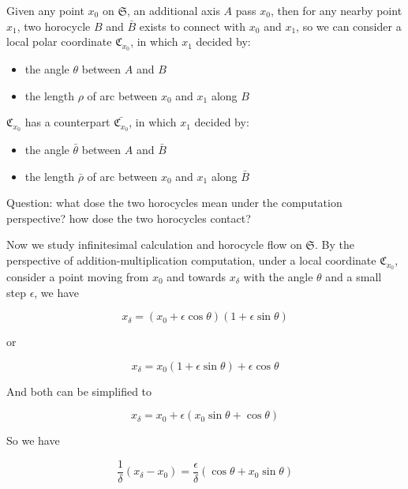 \documentclass{article}
\begin{document}
Given any point $x_0$ on $\mathfrak{S}$, an additional axis $A$ pass $x_0$, then for any nearby point $x_1$, two
horocycle $B$ and $\bar{B}$ exists to connect with $x_0$ and $x_1$, so we can consider a local polar coordinate
$\mathfrak{C}_{x_0}$, in which $x_1$ decided by:
\begin{itemize}
    \item the angle $\theta$ between $A$ and $B$
    \item the length $\rho$ of arc between $x_0$ and $x_1$ along $B$
\end{itemize}

$\mathfrak{C}_{x_0}$ has a counterpart $\bar{\mathfrak{C}_{x_0}}$, in which $x_1$ decided by:
\begin{itemize}
    \item the angle $\bar{\theta}$ between $A$ and $\bar{B}$
    \item the length $\bar{\rho}$ of arc between $x_0$ and $x_1$ along $\bar{B}$
\end{itemize}

Question: what dose the two horocycles mean under the computation perspective? how dose the two horocycles contact?

Now we study infinitesimal calculation and horocycle flow on $\mathfrak{S}$. By the perspective of
addition-multiplication computation, under a local coordinate $\mathfrak{C}_{x_0}$,
consider a point moving from $x_0$ and towards $x_{\delta}$ with the angle $\theta$ and a small step $\epsilon$, we have

\begin{equation}
    x_{\delta} = (x_0 + \epsilon \cos \theta)(1 + \epsilon \sin \theta)
\end{equation}

or

\begin{equation}
    x_{\delta} = x_0 (1 + \epsilon \sin \theta) + \epsilon \cos \theta
\end{equation}

And both can be simplified to

\begin{equation}
    x_{\delta} = x_0 + \epsilon (x_0 \sin \theta + \cos \theta)
\end{equation}

So we have

\begin{equation}
    \frac{1}{\delta} (x_{\delta} - x_0) = \frac{\epsilon}{\delta} (\cos \theta + x_0 \sin \theta)
\end{equation}
\end{document}
